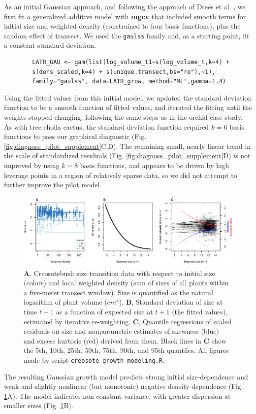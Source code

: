 \documentclass[12pt]{article}
\begin{document}
\begin{spacing}{1.35}
	As an initial Gaussian approach, and following the approach of Drees et al. \citeyear{drees2023demography}, we first fit a generalized additive model with \textbf{mgcv} that included smooth terms for initial size and weighted density (constrained to four basis functions), plus the random effect of transect. 
	We used the \texttt{gaulss} family and, as a starting point, fit a constant standard deviation. 
	\begin{lstlisting}
		LATR_GAU <- gam(list(log_volume_t1~s(log_volume_t,k=4) + 
		s(dens_scaled,k=4) + s(unique.transect,bs="re"),~1), 
		family="gaulss", data=LATR_grow, method="ML",gamma=1.4) 
	\end{lstlisting}
	Using the fitted values from this initial model, we updated the standard deviation function to be a smooth function of fitted values, and iterated the fitting until the weights stopped changing, following the same steps as in the orchid case study. As
	with tree cholla cactus, the standard deviation function required $k=6$ basis functions to pass our graphical 
	diagnostic (Fig. \ref{fig:diagnose_pilot_supplement}C,D). The remaining small, nearly linear trend in the scale of
	standardized residuals (Fig. \ref{fig:diagnose_pilot_supplement}D) is not improved by using $k=8$ basis functions, 
	and appears to be driven by high leverage points in a region of relatively sparse data, so we did not attempt
	to further improve the pilot model. 
	
	\begin{figure}[tbp]
		\centering
		\includegraphics[width=1.0\textwidth]{figures/creosote_diagnostics.pdf}
		\caption{\textbf{A}, Creosotebush size transition data with respect to initial size (colors) and local weighted density (sum of sizes of all plants within a five-meter transect window). Size is quantified as the natural logarithm of plant volume ($cm^3$). \textbf{B}, Standard deviation of size at time $t+1$ as a function of expected size at $t+1$ (the fitted values), estimated by iterative re-weighting. \textbf{C}, Quantile regressions of scaled residuals on size and nonparametric estimates of skewness (blue) and excess kurtosis (red) derived from them. Black lines in \textbf{C} show the 5th, 10th, 25th, 50th, 75th, 90th, and 95th quantiles. All figures made by script \texttt{creosote\_growth\_modeling.R}.}
		\label{fig:creosote_diagnostics}
	\end{figure} 
	The resulting Gaussian growth model predicts strong initial size-dependence and weak and slightly nonlinear (but monotonic) negative density dependence (Fig. \ref{fig:creosote_diagnostics}A). 
	The model indicates non-constant variance, with greater dispersion at smaller sizes (Fig. \ref{fig:creosote_diagnostics}B). 
	

\end{spacing}
\end{document}
